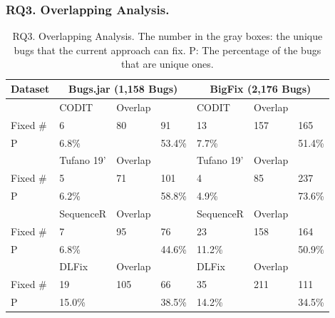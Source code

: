 \subsubsection{RQ3. Overlapping Analysis.}



{\footnotesize{
\begin{table}[t]
	\caption{RQ3. Overlapping Analysis. The number in the gray boxes: the unique bugs that the current approach can fix. P: The percentage of the bugs that are unique ones.}
	\begin{center}
		\renewcommand{\arraystretch}{1}
		\begin{tabular}{p{0.8cm}<{\centering}|p{1.1cm}<{\centering}|p{0.8cm}<{\centering}|p{0.7cm}<{\centering}|p{1.1cm}<{\centering}|p{0.8cm}<{\centering}|p{0.7cm}<{\centering}}\hline
			Dataset&\multicolumn{3}{c|}{Bugs.jar (1,158 Bugs)}&\multicolumn{3}{c}{BigFix (2,176 Bugs)}\\
			\hline
			             & CODIT   & Overlap   & \tool  & CODIT   & Overlap   & \tool \\
			\hline
			Fixed \#     & \cellcolor{mygray} 6  & 80   & \cellcolor{mygray} 91  & \cellcolor{mygray} 13 &  157  & \cellcolor{mygray} 165 \\
			P            & 6.8\%   &    & 53.4\%  & 7.7\%   &    & 51.4\% \\
			\hline
			             & Tufano 19'   & Overlap   & \tool  & Tufano 19'   & Overlap   & \tool \\
			\hline
			Fixed \#     & \cellcolor{mygray} 5  &  71  & \cellcolor{mygray} 101 & \cellcolor{mygray}4 & 85   & \cellcolor{mygray}237 \\
			P            &  6.2\%  &    &  58.8\% &  4.9\%  &    & 73.6\% \\
			\hline
			             & SequenceR   & Overlap   & \tool  & SequenceR   & Overlap   & \tool \\
			\hline
			Fixed \#     & \cellcolor{mygray} 7  &   95 & \cellcolor{mygray} 76 & \cellcolor{mygray} 23 &  158  & \cellcolor{mygray} 164 \\
			P            &   6.8\% &    & 44.6\%  &   11.2\% &    & 50.9\% \\
			\hline
			             & DLFix   & Overlap   & \tool  & DLFix   & Overlap   & \tool \\
			\hline
			Fixed \#     & \cellcolor{mygray}  19 &  105  & \cellcolor{mygray} 66 & \cellcolor{mygray}35 &  211  & \cellcolor{mygray}111 \\
			P            &  15.0\%  &    & 38.5\%  &  14.2\%  &    &  34.5\%\\

\end{tabular}
\end{center}
\end{table}}}
